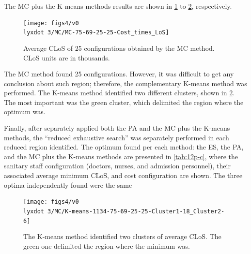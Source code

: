 The MC plus the K-means methods results are shown in \ref{subfig:mc12-3}
to \ref{subfig:km12-3}, respectively.
\begin{figure}[H]
\centering{}\texttt{[image: figs4/v0\\lyxdot 3/MC/MC-75-69-25-25-Cost\_times\_LoS]}\caption{Average CLoS of 25 configurations obtained by the MC method. CLoS
units are in thousands. \label{subfig:mc12-3}}
\end{figure}
The MC method found 25 configurations. However, it was difficult to
get any conclusion about such region; therefore, the complementary
K-means method was performed. The K-means method identified two different
clusters, shown in \ref{subfig:km12-3}. The most important was the
green cluster, which delimited the region where the optimum was.%

Finally, after separately applied both the PA and the MC plus the
K-means methods, the \textquotedblleft{}reduced exhaustive search\textquotedblright{}
was separately performed in each reduced region identified. The optimum
found per each method: the ES, the PA, and the MC plus the K-means
methods are presented in \ref{tab:12p-c}, where the sanitary staff
configuration (doctors, nurses, and admission personnel), their associated
average minimum CLoS, and cost configuration are shown. The three
optima independently found were the same
\begin{figure}[H]
\begin{centering}
\texttt{[image: figs4/v0\\lyxdot 3/MC/K-means-1134-75-69-25-25-Cluster1-18\_Cluster2-6]}
\par\end{centering}

\caption{The K-means method identified two clusters of average CLoS. The green
one delimited the region where the minimum was. \label{subfig:km12-3}}
\end{figure}


